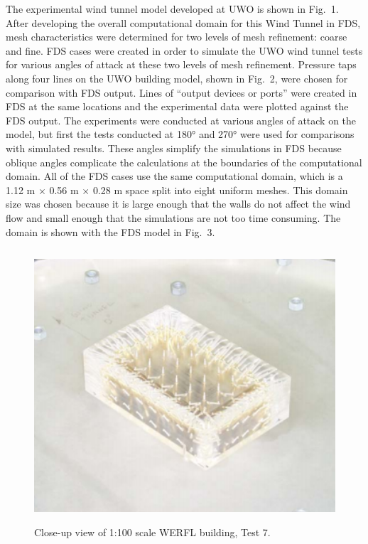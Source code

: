 The experimental wind tunnel model developed at UWO is shown in Fig.~1. After developing the overall computational domain for this Wind Tunnel in FDS, mesh characteristics were determined for two levels of mesh refinement: coarse and fine. FDS cases were created in order to simulate the UWO wind tunnel tests for various angles of attack at these two levels of mesh refinement. Pressure taps along four lines on the UWO building model, shown in Fig.~2, were chosen for comparison with FDS output. Lines of ``output devices or ports'' were created in FDS at the same locations and the experimental data were plotted against the FDS output. The experiments were conducted at various angles of attack on the model, but first the tests conducted at 180\si{\degree} and 270\si{\degree} were used for comparisons with simulated results. These angles simplify the simulations in FDS because oblique angles complicate the calculations at the boundaries of the computational domain. All of the FDS cases use the same computational domain, which is a 1.12 m $\times$ 0.56 m $\times$ 0.28 m space split into eight uniform meshes. This domain size was chosen because it is large enough that the walls do not affect the wind flow and small enough that the simulations are not too time consuming. The domain is shown with the FDS model in Fig.~3.

\begin{figure}
\begin{center}
\includegraphics[height=4in]{FIGURES/Wind_Engineering/UWO_Test_7_closeup}
\caption[Close-up view of 1:100 scale WERFL building, Test 7]{Close-up view of 1:100 scale WERFL building, Test 7.}
\label{UWO_Test_7_closeup}
\end{center}
\end{figure}

